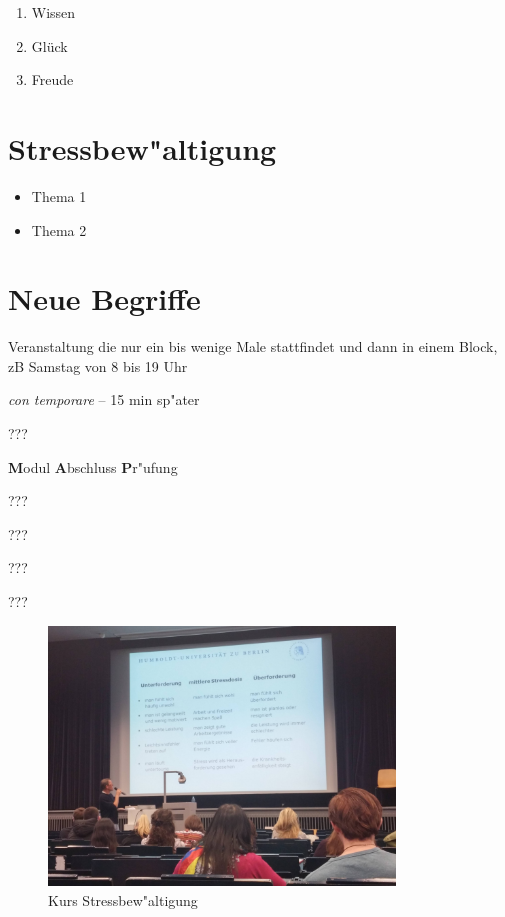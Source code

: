 \documentclass[]{scrartcl}
\begin{document}
\begin{enumerate}
  \item Wissen
  \item Glück
  \item Freude
\end{enumerate}

\section{Stressbew"altigung}

\begin{itemize}
    \item Thema 1
    \item Thema 2
  \end{itemize}


\section{Neue Begriffe}

\begin{description}[leftmargin=!,labelwidth=\widthof{\bfseries Blockveranstaltung}]
  \item[Blockveranstaltung] Veranstaltung die nur ein bis wenige Male stattfindet und dann in einem Block, zB Samstag von 8 bis 19 Uhr
  \item[ct] \emph{con temporare} -- 15 min sp"ater
  \item[CMS] ???
  \item[MAP] \textbf{M}odul \textbf{A}bschluss \textbf{P}r"ufung
  \item[jstor] ???
  \item[Wiley] ???
  \item[Springerlink] ???
  \item[KOBV] ???
\end{description}



\begin{figure}[h]
	\centering
	\includegraphics[width=0.82\textwidth]{images/studienorga/stress.jpg}
	\caption{Kurs Stressbew"altigung}
	\label{fig:stress}
\end{figure}
\end{document}
